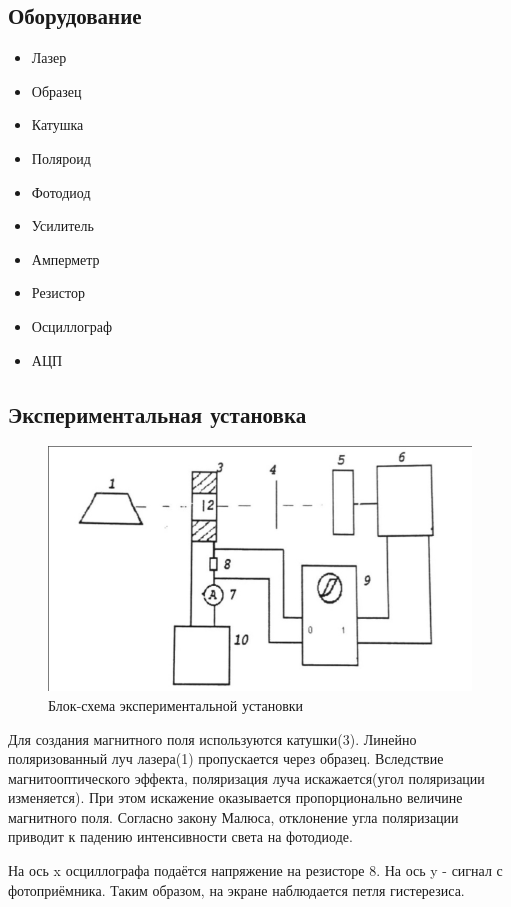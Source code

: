\documentclass[a4paper, 12pt]{extarticle}
\begin{document}
\subsection*{\textcolor{sub_header}{Оборудование}}
\begin{itemize}
    \item Лазер
    \item Образец 
    \item Катушка
    \item Поляроид
    \item Фотодиод
    \item Усилитель
    \item Амперметр
    \item Резистор 
    \item Осциллограф
    \item АЦП
\end{itemize}


\subsection*{\textcolor{sub_header}{Экспериментальная установка}}
\begin{figure}[htbp]
    \centering
    \includegraphics[width = 0.8 \textwidth]{setup.png}
    \caption{Блок-схема экспериментальной установки}
    \label{fig:setup}
\end{figure}

Для создания магнитного поля используются катушки(3). Линейно поляризованный
луч лазера(1) пропускается через образец. Вследствие магнитооптического эффекта,
поляризация луча искажается(угол поляризации изменяется). При этом искажение оказывается пропорционально величине
магнитного поля. Согласно закону Малюса, отклонение угла поляризации приводит к падению интенсивности света на фотодиоде.

На ось x осциллографа подаётся напряжение на резисторе 8. На ось y - сигнал с фотоприёмника. 
Таким образом, на экране наблюдается петля гистерезиса.
\end{document}
